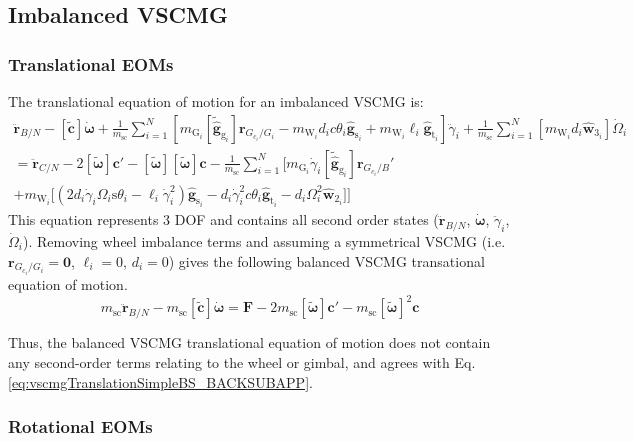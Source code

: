 \subsection{Imbalanced VSCMG}

\subsubsection{Translational EOMs}
The translational equation of motion for an imbalanced VSCMG is:
\begin{multline}
\ddot{\bm r}_{B/N} - [\tilde{\bm{c}}]\dot{\bm \omega} 
+ \frac{1}{m_{\text{sc}}} \sum\limits_{i=1}^{N} \left[ m_{\text{G}_i} \left[\tilde{\hat{\bm g}}_{\text{g}_i} \right] \bm{r}_{G_{c_i}/G_i} - m_{\text{W}_i}d_ic\theta_i\hat{\bm{g}}_{\text{s}_i} + m_{\text{W}_i}\ell_i\hat{\bm{g}}_{\text{t}_i} \right] \ddot{\gamma}_i
+ \frac{1}{m_{\text{sc}}} \sum\limits_{i=1}^{N} \left[ m_{\text{W}_i}d_i\hat{\bm w}_{3_i} \right] \dot{\Omega}_i
\\= \ddot{\bm r}_{C/N} - 2[\tilde{\bm{\omega}}]\bm{c}' - [\tilde{\bm{\omega}}][\tilde{\bm{\omega}}]\bm{c} 
- \frac{1}{m_{\text{sc}}} \sum\limits_{i=1}^{N} \Big[ 
m_{\text{G}_i}\dot{\gamma}_i[\tilde{\hat{\bm g}}_{\text{g}_i}] \bm{r}_{G_{c_i}/B}'
\\+ m_{\text{W}_i} \big[ \left(2d_i\dot{\gamma}_i\Omega_i\text{s}\theta_i - \ell_i\dot{\gamma}_i^2 \right)\hat{\bm{g}}_{\text{s}_i} - d_i\dot{\gamma}_i^2c\theta_i\hat{\bm{g}}_{\text{t}_i} - d_i\Omega_i^2 \hat{\bm{w}}_{2_i} \big] \Big]
\end{multline}
This equation represents 3 DOF and contains all second order states ($\ddot{\bm r}_{B/N}$, $\dot{\bm \omega}$, $\ddot{\gamma}_i$, $\dot{\Omega}_i$). Removing wheel imbalance terms and assuming a symmetrical VSCMG (i.e. $\bm{r}_{G_{c_i}/G_i} = \bm{0}$, $\ell_i = 0$, $d_i = 0$) gives the following balanced VSCMG transational equation of motion.
\begin{equation}
	m_\text{sc}\ddot{\bm r}_{B/N} - m_\text{sc}[\tilde{\bm{c}}]\dot{\bm \omega} 
	= \bm{F} - 2m_\text{sc}[\tilde{\bm{\omega}}]\bm{c}' - m_\text{sc}[\tilde{\bm{\omega}}]^2\bm{c} 
	\label{eq:vscmgTranslationSimple}
\end{equation}

Thus, the balanced VSCMG translational equation of motion does not contain any second-order terms relating to the wheel or gimbal, and agrees with Eq. \ref{eq:vscmgTranslationSimpleBS_BACKSUBAPP}.

\subsubsection{Rotational EOMs}

